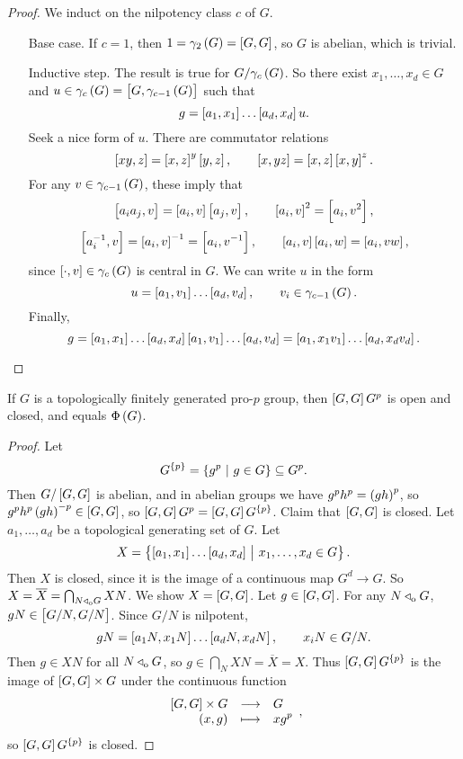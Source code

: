 \begin{proof}
We induct on the nilpotency class $ c $ of $ G $.
\begin{itemize}[leftmargin=1in]
\item[Base case.] If $ c = 1 $, then $ 1 = \gamma_2\br{G} = \sbr{G, G} $, so $ G $ is abelian, which is trivial.
\item[Inductive step.] The result is true for $ G / \gamma_c\br{G} $. So there exist $ x_1, \dots, x_d \in G $ and $ u \in \gamma_c\br{G} = \sbr{G, \gamma_{c - 1}\br{G}} $ such that
$$ g = \sbr{a_1, x_1} \dots \sbr{a_d, x_d}u. $$
Seek a nice form of $ u $. There are commutator relations
$$ \sbr{xy, z} = \sbr{x, z}^y\sbr{y, z}, \qquad \sbr{x, yz} = \sbr{x, z}\sbr{x, y}^z. $$
For any $ v \in \gamma_{c - 1}\br{G} $, these imply that
$$ \sbr{a_ia_j, v} = \sbr{a_i, v}\sbr{a_j, v}, \qquad \sbr{a_i, v}^2 = \sbr{a_i, v^2}, $$
$$ \sbr{a_i^{-1}, v} = \sbr{a_i, v}^{-1} = \sbr{a_i, v^{-1}}, \qquad \sbr{a_i, v}\sbr{a_i, w} = \sbr{a_i, vw}, $$
since $ \sbr{\cdot, v} \in \gamma_c\br{G} $ is central in $ G $. We can write $ u $ in the form
$$ u = \sbr{a_1, v_1} \dots \sbr{a_d, v_d}, \qquad v_i \in \gamma_{c - 1}\br{G}. $$
Finally,
$$ g = \sbr{a_1, x_1} \dots \sbr{a_d, x_d}\sbr{a_1, v_1} \dots \sbr{a_d, v_d} = \sbr{a_1, x_1v_1} \dots \sbr{a_d, x_dv_d}. $$
\end{itemize}
\end{proof}

\begin{proposition}
If $ G $ is a topologically finitely generated pro-$ p $ group, then $ \sbr{G, G}G^p $ is open and closed, and equals $ \Phi\br{G} $.
\end{proposition}

\begin{proof}
Let
$$ G^{\cbr{p}} = \cbr{g^p \st g \in G} \subseteq G^p. $$
Then $ G / \sbr{G, G} $ is abelian, and in abelian groups we have $ g^ph^p = \br{gh}^p $, so $ g^ph^p\br{gh}^{-p} \in \sbr{G, G} $, so $ \sbr{G, G}G^p = \sbr{G, G}G^{\cbr{p}} $. Claim that $ \sbr{G, G} $ is closed. Let $ a_1, \dots, a_d $ be a topological generating set of $ G $. Let
$$ X = \cbr{\sbr{a_1, x_1} \dots \sbr{a_d, x_d} \st x_1, \dots, x_d \in G}. $$
Then $ X $ is closed, since it is the image of a continuous map $ G^d \to G $. So $ X = \overline{X} = \bigcap_{N \triangleleft_{\mathrm{o}} G} XN $. We show $ X = \sbr{G, G} $. Let $ g \in \sbr{G, G} $. For any $ N \triangleleft_{\mathrm{o}} G $, $ gN \in \sbr{G / N, G / N} $. Since $ G / N $ is nilpotent,
$$ gN = \sbr{a_1N, x_1N} \dots \sbr{a_dN, x_dN}, \qquad x_iN \in G / N. $$
Then $ g \in XN $ for all $ N \triangleleft_{\mathrm{o}} G $, so $ g \in \bigcap_N XN = \overline{X} = X $. Thus $ \sbr{G, G}G^{\cbr{p}} $ is the image of $ \sbr{G, G} \times G $ under the continuous function
$$ \function{\sbr{G, G} \times G}{G}{\br{x, g}}{xg^p}, $$
so $ \sbr{G, G}G^{\cbr{p}} $ is closed.
\end{proof}

